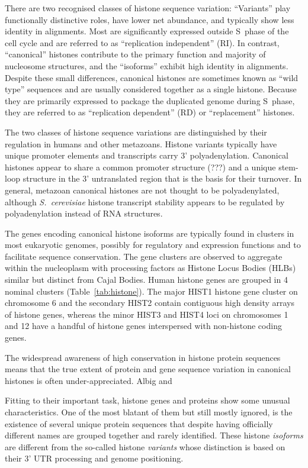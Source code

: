 \documentclass[10pt,a4paper,draft]{article}
\newcommand{\think}[2][]{\todo[caption={#2}, size=\small, #1]{\renewcommand{\baselinestretch}{0.5}\selectfont#2\par}}
\begin{document}
    There are two recognised classes of histone sequence variation: ``Variants'' play functionally distinctive
    roles, have lower net abundance, and typically show less identity in alignments. Most are significantly
    expressed outside S~phase of the cell cycle and are referred to as ``replication independent'' (RI).
    In contrast, ``canonical'' histones contribute to the primary function and majority of nucleosome
    structures, and the ``isoforms'' exhibit high identity in alignments. Despite these small differences,
    canonical histones are sometimes known as ``wild type'' sequences and are usually considered together
    as a single histone. Because they are primarily expressed to package the duplicated genome during S~phase,
    they are referred to as ``replication dependent'' (RD) or ``replacement'' histones.

    The two classes of histone sequence variations are distinguished by their regulation in humans and other
    metazoans. Histone variants typically have unique promoter elements and transcripts carry 3' polyadenylation.
    Canonical histones appear to share a common promoter structure (???) and a unique stem-loop structure in
    the 3' untranslated region that is the basis for their turnover. In general, metazoan canonical histones
    are not thought to be polyadenylated, although \textit{S.\ cerevisiae} histone transcript stability
    appears to be regulated by polyadenylation instead of RNA structures.

    The genes encoding canonical histone isoforms are typically found in clusters in most eukaryotic genomes,
    possibly for regulatory and expression functions and to facilitate sequence conservation. The gene clusters
    are observed to aggregate within the nucleoplasm with processing factors as Histone Locus Bodies
    (HLBs) similar but distinct from Cajal Bodies. Human histone genes are grouped in 4 nominal clusters
    (Table~\ref{tab:histone}). The major HIST1 histone gene cluster on chromosome 6 and the secondary
    HIST2 contain contiguous high density arrays of histone genes, whereas the minor HIST3 and HIST4
    loci on chromosomes 1 and 12 have a handful of histone genes interspersed with non-histone coding genes.

    The widespread awareness of high conservation in histone protein sequences means that the true extent
    of protein and gene sequence variation in canonical histones is often under-appreciated. Albig and 

    Fitting to their important task, histone genes and proteins show some unusual characteristics.
    One of the most blatant of them but still mostly ignored, is the existence of several unique protein
    sequences \think{should explain better that we're not talking about SNP?} that despite having
    officially different names are grouped together and rarely identified. These histone
    \emph{isoforms} are different from the so-called histone \emph{variants} whose distinction
    is based on their 3' UTR processing and genome positioning.
\end{document}
